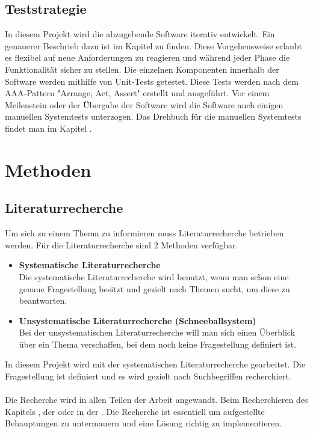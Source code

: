 \documentclass[a4paper, table]{article}
\begin{document}
\subsection{Teststrategie}\label{Teststrategie}
In diesem Projekt wird die abzugebende Software iterativ entwickelt.
Ein genauerer Beschrieb dazu ist im Kapitel  zu finden.
Diese Vorgehensweise erlaubt es flexibel auf neue Anforderungen zu reagieren und
während jeder Phase die Funktionalität sicher zu stellen.
\newline
Die einzelnen Komponenten innerhalb der Software werden mithilfe von Unit-Tests getestet.
Diese Tests werden nach dem AAA-Pattern "Arrange, Act, Assert" erstellt und ausgeführt. \autocite{noauthor_arrangeactassert_nodate}
Vor einem Meilenstein oder der Übergabe der Software wird die Software auch einigen manuellen Systemtests unterzogen.
\newline
Das Drehbuch für die manuellen Systemtests findet man im Kapitel .

\newpage
\section{Methoden}
\subsection{Literaturrecherche}
Um sich zu einem Thema zu informieren muss Literaturrecherche betrieben werden.
Für die Literaturrecherche sind 2 Methoden verfügbar. \autocite{solis_so_2021}
\begin{itemize}
    \item \textbf{Systematische Literaturrecherche}\\
    Die systematische Literaturrecherche wird benutzt, wenn man schon eine genaue Fragestellung besitzt und gezielt nach Themen sucht, um diese zu beantworten.
    \item \textbf{Unsystematische Literaturrecherche (Schneeballsystem)}\\
    Bei der unsystematischen Literaturrecherche will man sich einen Überblick über ein Thema verschaffen, bei dem noch keine Fragestellung definiert ist.
\end{itemize}
In diesem Projekt wird mit der systematischen Literaturrecherche gearbeitet.
Die Fragestellung ist definiert und es wird gezielt nach Suchbegriffen recherchiert.\\\\
Die Recherche wird in allen Teilen der Arbeit angewandt.
Beim Recherchieren des Kapitels , der  oder in der .
Die Recherche ist essentiell um aufgestellte Behauptungen zu untermauern und eine Lösung richtig zu implementieren. 
\end{document}
